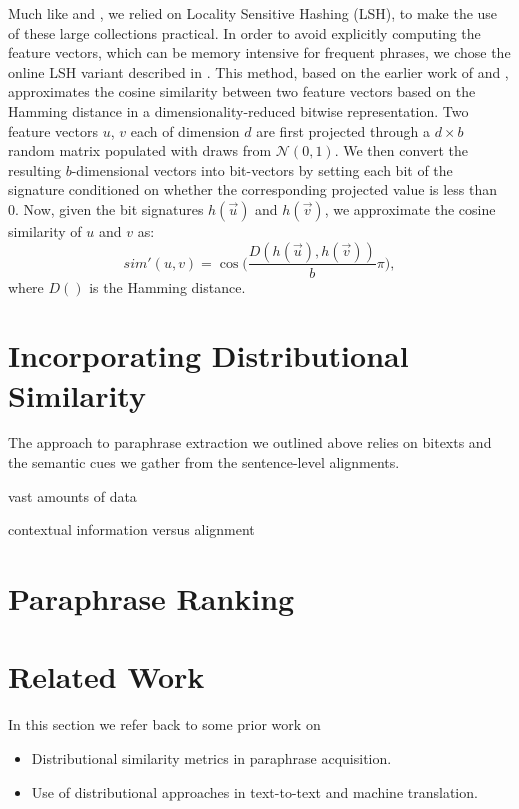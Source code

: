 \documentclass[11pt]{article}
\begin{document}
Much like  and , we
relied on Locality Sensitive Hashing (LSH), to make the use of these
large collections practical. In order to avoid explicitly computing
the feature vectors, which can be memory intensive for frequent
phrases, we chose the online LSH variant described in
\cite{VanDurmeLallACL10}. This method, based on the earlier work of
 and , approximates the
cosine similarity between two feature vectors based on the Hamming
distance in a dimensionality-reduced bitwise representation. Two
feature vectors $u$, $v$ each of dimension $d$ are first projected
through a $d \times b$ random matrix populated with draws from
$\mathcal{N}(0,1)$. We then convert the resulting $b$-dimensional
vectors into bit-vectors by setting each bit of the signature
conditioned on whether the corresponding projected value is less than
0. Now, given the bit signatures $h(\vec{u})$ and $h(\vec{v})$, we
approximate the cosine similarity of $u$ and $v$ as:
\begin{equation*}
  \mathit{sim'}(u, v) =
  \cos\Big(\frac{D(h(\vec{u}),h(\vec{v}))}{b}\pi\Big) ,
\end{equation*}
where $D()$ is the Hamming distance.



\section{Incorporating Distributional Similarity}
\label{sec-scoring}

The approach to paraphrase extraction we outlined above relies on
bitexts and the semantic cues we gather from the sentence-level
alignments.

vast amounts of data

contextual information versus alignment


\section{Paraphrase Ranking}
\label{sec-ranking}



\section{Related Work}
\label{sec-related-work}

In this section we refer back to some prior work on
\begin{itemize}
\item Distributional similarity metrics in paraphrase acquisition.
\item Use of distributional approaches in text-to-text and machine translation.
\end{itemize}
\end{document}
